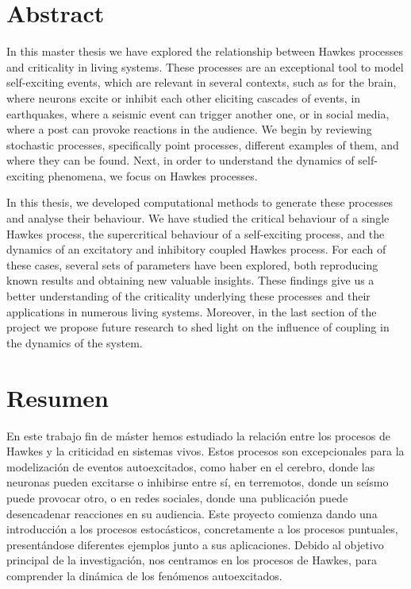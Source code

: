 \chapter*{Abstract}
In this master thesis we have explored the relationship between Hawkes processes and criticality in living systems. These processes are an exceptional tool to
model self-exciting events, which are relevant in several contexts, such as for the brain, where neurons excite or inhibit each other eliciting cascades of events, in earthquakes, 
where a seismic event can trigger another one, or in social media, where a post can provoke reactions in the audience.
We begin by reviewing stochastic processes, specifically point processes, different examples of them, and where they can be found. Next, in order to understand the dynamics of self-exciting 
phenomena, we focus on Hawkes processes.

In this thesis, we developed computational methods to generate these processes and analyse their behaviour. We have studied the critical behaviour of a single Hawkes process,
the supercritical behaviour of a self-exciting process, and the dynamics of an excitatory and inhibitory coupled Hawkes process. For each of these cases, several sets of parameters have been
explored, both reproducing known results and obtaining new valuable insights.
These findings give us a better understanding of the criticality underlying these processes and their applications in numerous living systems. Moreover, in the last section of the project
we propose future research to shed light on the influence of coupling in the dynamics of the system.

\chapter*{Resumen}

En este trabajo fin de máster hemos estudiado la relación entre los procesos de Hawkes y la criticidad en sistemas vivos. Estos procesos son excepcionales para la modelización de eventos 
autoexcitados, como haber en el cerebro, donde las neuronas pueden excitarse o inhibirse entre sí, en terremotos, donde un seísmo puede provocar otro, o en redes sociales, donde una 
publicación puede desencadenar reacciones en su audiencia. Este proyecto comienza dando una introducción a los procesos estocásticos, concretamente a los procesos puntuales, presentándose 
diferentes ejemplos junto a sus aplicaciones. Debido al objetivo principal de la investigación, nos centramos en los procesos de Hawkes, para comprender la dinámica de los fenómenos autoexcitados.

